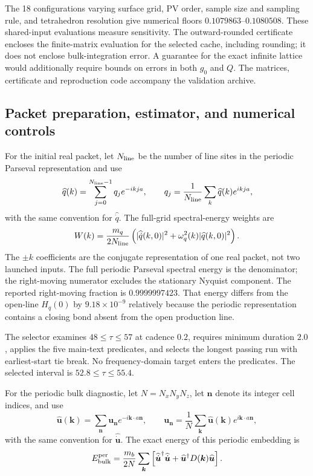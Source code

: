 \documentclass[10pt,aps,pre,onecolumn,notitlepage,nofootinbib]{revtex4-2}
\newcommand{\vk}{\bm k}
\begin{document}
The 18 configurations varying surface grid, PV order, sample size and sampling rule, and tetrahedron resolution give numerical floors $0.1079863$--$0.1080508$. These shared-input evaluations measure sensitivity. The outward-rounded certificate encloses the finite-matrix evaluation for the selected cache, including rounding; it does not enclose bulk-integration error. A guarantee for the exact infinite lattice would additionally require bounds on errors in both $g_0$ and $Q$. The matrices, certificate and reproduction code accompany the validation archive.

\subsection{Packet preparation, estimator, and numerical controls}

For the initial real packet, let $N_{\rm line}$ be the number of line sites in the periodic Parseval representation and use
\begin{equation}
 \widehat q(k)=\sum_{j=0}^{N_{\rm line}-1}q_j e^{-ikja},
 \qquad
 q_j=\frac{1}{N_{\rm line}}\sum_k\widehat q(k)e^{ikja},
\end{equation}
with the same convention for $\widehat{\dot q}$. The full-grid spectral-energy weights are
\begin{equation}
 W(k)=\frac{m_q}{2N_{\rm line}}\left(|\widehat{\dot q}(k,0)|^2+\omega_q^2(k)|\widehat q(k,0)|^2\right).
\end{equation}
The $\pm k$ coefficients are the conjugate representation of one real packet, not two launched inputs. The full periodic Parseval spectral energy is the denominator; the right-moving numerator excludes the stationary Nyquist component. The reported right-moving fraction is $0.9999997423$. That energy differs from the open-line $H_q(0)$ by $9.18\times10^{-9}$ relatively because the periodic representation contains a closing bond absent from the open production line.

The selector examines $48\le\tau\le57$ at cadence $0.2$, requires minimum duration $2.0$, applies the five main-text predicates, and selects the longest passing run with earliest-start tie break. No frequency-domain target enters the predicates. The selected interval is $52.8\le\tau\le55.4$.

For the periodic bulk diagnostic, let $N=N_xN_yN_z$, let $\bm n$ denote its integer cell indices, and use
\begin{equation}
 \widehat{\bm u}(\vk)=\sum_{\bm n}\bm u_{\bm n}e^{-i\vk\cdot a\bm n},
 \qquad
 \bm u_{\bm n}=\frac{1}{N}\sum_{\vk}\widehat{\bm u}(\vk)e^{i\vk\cdot a\bm n},
\end{equation}
with the same convention for $\widehat{\dot{\bm u}}$. The exact energy of this periodic embedding is
\begin{equation}
 E_{\rm bulk}^{\rm per}
 =\frac{m_b}{2N}\sum_{\vk}
 \left[
  \widehat{\dot{\bm u}}^{\dagger}\widehat{\dot{\bm u}}
  +\widehat{\bm u}^{\dagger}D(\vk)\widehat{\bm u}
 \right].
\end{equation}
\end{document}
